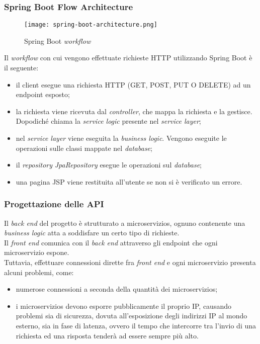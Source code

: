 \subsubsection{Spring Boot Flow Architecture}
\begin{figure}[H] 
    \centering 
    \texttt{[image: spring-boot-architecture.png]} 
    \caption{Spring Boot \textit{workflow}}
\end{figure}
Il \textit{workflow} con cui vengono effettuate richieste HTTP utilizzando Spring Boot è il seguente:
\begin{itemize}
    \item il client esegue una richiesta HTTP (GET, POST, PUT O DELETE) ad un   \gls{endpoint} esposto;
    \item la richiesta viene ricevuta dal \textit{controller}, che mappa la richiesta e la gestisce. Dopodiché chiama la \textit{service logic} presente nel \textit{service layer};
    \item nel \textit{service layer} viene eseguita la \textit{business logic}. Vengono eseguite le operazioni sulle classi mappate nel \textit{database};
    \item il \textit{repository} \textit{JpaRepository} esegue le operazioni sul \textit{database};
    \item una pagina \gls{JSP} viene restituita all'utente se non si è verificato un errore.
\end{itemize} 


\subsubsection{Progettazione delle API}
Il \textit{back end} del progetto è strutturato a \glspl{microservizio}, ognuno contenente una \textit{business logic} atta a soddisfare un certo tipo di richieste.\\
Il \textit{front end} comunica con il \textit{back end} attraverso gli \gls{endpoint} che ogni \gls{microservizio} espone. \\
Tuttavia, effettuare connessioni dirette fra \textit{front end} e ogni \gls{microservizio} presenta alcuni problemi, come: 
\begin{itemize}
    \item numerose connessioni a seconda della quantità dei \glspl{microservizio};
    \item i \glspl{microservizio} devono esporre pubblicamente il proprio \gls{IP}, causando problemi sia di sicurezza, dovuta all'esposizione degli indirizzi \gls{IP} al mondo esterno, sia in fase di latenza, ovvero il tempo che intercorre tra l'invio di una richiesta ed una risposta tenderà ad essere sempre più alto.
\end{itemize}

